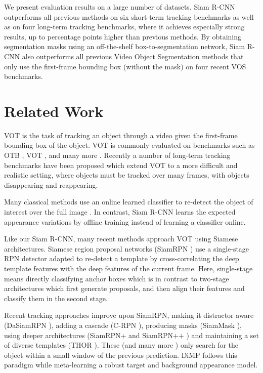 \documentclass[10pt,twocolumn,letterpaper]{article}
\newcommand{\PARbegin}[1]{\noindent {\bf #1~}}
\begin{document}
We present evaluation results on a large number of datasets. Siam R-CNN outperforms all previous methods on six short-term tracking benchmarks as well as on four long-term tracking benchmarks, where it achieves especially strong results, up to  percentage points higher than previous methods. By obtaining segmentation masks using an off-the-shelf box-to-segmentation network, Siam R-CNN also outperforms all previous Video Object Segmentation methods that only use the first-frame bounding box (without the mask) on four recent VOS benchmarks.


\section{Related Work}

\PARbegin{Visual Object Tracking (VOT).}
VOT is the task of tracking an object through a video given the first-frame bounding box of the object. VOT is commonly evaluated on benchmarks such as OTB \cite{Wu13CVPR,Wu15TPAMI}, VOT \cite{Kristan16TPAMI,Kristan18ECCVW}, and many more \cite{Muller18ECCV,Huang18Arxiv,Zhu18Arxiv,Mueller16ECCV,Galoogahi17ICCV}. Recently a number of long-term tracking benchmarks have been proposed \cite{lukevzivc2018now,Valmadre18ECCV,Fan19CVPRLASOT} which extend VOT to a more difficult and realistic setting, where objects must be tracked over many frames, with objects disappearing and reappearing.

Many classical methods use an online learned classifier to re-detect the object of interest over the full image \cite{Avidan04PAMI, Grabner06BMVC, Babenko11PAMI, Saffari10CVPR, Hare15PAMI, Saffari09ICCVW, TLD}. In contrast, Siam R-CNN learns the expected appearance variations by offline training instead of learning a classifier online.

Like our Siam R-CNN, many recent methods approach VOT using Siamese architectures. Siamese region proposal networks (SiamRPN \cite{Li18CVPRSiamRPN}) use a single-stage RPN \cite{Ren15NIPS} detector adapted to re-detect a template by cross-correlating the deep template features with the deep features of the current frame. Here, single-stage means directly classifying anchor boxes \cite{Liu16ECCV} which is in contrast to two-stage architectures \cite{Ren15NIPS} which first generate proposals, and then  align their features and classify them in the second stage.

Recent tracking approaches improve upon SiamRPN, making it distractor aware (DaSiamRPN \cite{Zhu18ECCV}), adding a cascade (C-RPN \cite{Fan19CVPRCRPN}), producing masks (SiamMask \cite{Wang19CVPR}), using deeper architectures (SiamRPN+ \cite{Zhang19CVPR} and SiamRPN++ \cite{Li19CVPR}) and maintaining a set of diverse templates (THOR \cite{Sauer19BMVC}). These (and many more \cite{Bolme10CVPR,Henriques15TPAMI,Ma15ICCV}) only search for the object within a small window of the previous prediction. DiMP \cite{Bhat19ICCV} follows this paradigm while meta-learning a robust target and background appearance model.
\end{document}

